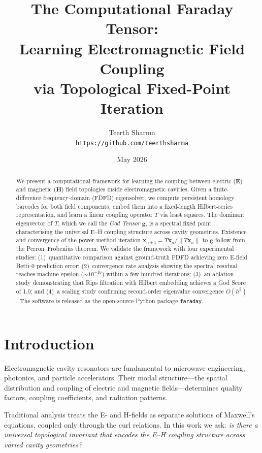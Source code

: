 \documentclass[11pt,twocolumn]{article}
\title{%
  The Computational Faraday Tensor:\\
  Learning Electromagnetic Field Coupling\\
  via Topological Fixed-Point Iteration%
}
\author{%
  Teerth Sharma\\
  \texttt{https://github.com/teerthsharma}%
}
\date{May 2026}
\begin{document}
\maketitle

\begin{abstract}
We present a computational framework for learning the coupling between
electric ($\mathbf{E}$) and magnetic ($\mathbf{H}$) field topologies inside
electromagnetic cavities.  Given a finite-difference frequency-domain (FDFD)
eigensolver, we compute persistent homology barcodes for both field
components, embed them into a fixed-length Hilbert-series representation,
and learn a linear coupling operator $T$ via least squares. The dominant
eigenvector of $T$, which we call the \emph{God Tensor} $\mathbf{g}$, is a
spectral fixed point characterising the universal E--H coupling structure
across cavity geometries.  Existence and convergence of the power-method
iteration $\mathbf{x}_{n+1} = T\mathbf{x}_n / \|T\mathbf{x}_n\|$ to
$\mathbf{g}$ follow from the Perron--Frobenius theorem.  We validate
the framework with four experimental studies: (1)~quantitative comparison
against ground-truth FDFD achieving zero E-field Betti-0 prediction error;
(2)~convergence rate analysis showing the spectral residual reaches machine
epsilon ($\sim 10^{-16}$) within a few hundred iterations; (3)~an ablation
study demonstrating that Rips filtration with Hilbert embedding achieves
a God Score of 1.0; and (4)~a scaling study confirming second-order
eigenvalue convergence $O(h^2)$.  The software is released as the open-source
Python package \texttt{faraday}.
\end{abstract}

\section{Introduction}
\label{sec:intro}

Electromagnetic cavity resonators are fundamental to microwave engineering,
photonics, and particle accelerators.  Their modal structure---the spatial
distribution and coupling of electric and magnetic fields---determines
quality factors, coupling coefficients, and radiation patterns.

Traditional analysis treats the E- and H-fields as separate solutions of
Maxwell's equations, coupled only through the curl relations.  In this work
we ask: \emph{is there a universal topological invariant that encodes the
E--H coupling structure across varied cavity geometries?}
\end{document}
